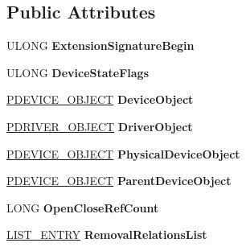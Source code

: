 \subsection*{Public Attributes}
\begin{DoxyCompactItemize}
\item 
\hypertarget{struct__DEVICE__EXTENSION_a3d2254b6955594ef19384f6e896a6509}{}U\+L\+O\+N\+G {\bfseries Extension\+Signature\+Begin}\label{struct__DEVICE__EXTENSION_a3d2254b6955594ef19384f6e896a6509}

\item 
\hypertarget{struct__DEVICE__EXTENSION_aed91a62442cb55f67cafd38ef2d188be}{}U\+L\+O\+N\+G {\bfseries Device\+State\+Flags}\label{struct__DEVICE__EXTENSION_aed91a62442cb55f67cafd38ef2d188be}

\item 
\hypertarget{struct__DEVICE__EXTENSION_a3d486ed344b5f222be45ec6d866df1b5}{}\hyperlink{struct__DEVICE__OBJECT}{P\+D\+E\+V\+I\+C\+E\+\_\+\+O\+B\+J\+E\+C\+T} {\bfseries Device\+Object}\label{struct__DEVICE__EXTENSION_a3d486ed344b5f222be45ec6d866df1b5}

\item 
\hypertarget{struct__DEVICE__EXTENSION_a3f483766814952d27da13d80801a2ce2}{}\hyperlink{struct__DRIVER__OBJECT}{P\+D\+R\+I\+V\+E\+R\+\_\+\+O\+B\+J\+E\+C\+T} {\bfseries Driver\+Object}\label{struct__DEVICE__EXTENSION_a3f483766814952d27da13d80801a2ce2}

\item 
\hypertarget{struct__DEVICE__EXTENSION_ab982ad8ed7465117668ff5227c3b0167}{}\hyperlink{struct__DEVICE__OBJECT}{P\+D\+E\+V\+I\+C\+E\+\_\+\+O\+B\+J\+E\+C\+T} {\bfseries Physical\+Device\+Object}\label{struct__DEVICE__EXTENSION_ab982ad8ed7465117668ff5227c3b0167}

\item 
\hypertarget{struct__DEVICE__EXTENSION_a2756f4d188b8636d5b1b685b1881e1ea}{}\hyperlink{struct__DEVICE__OBJECT}{P\+D\+E\+V\+I\+C\+E\+\_\+\+O\+B\+J\+E\+C\+T} {\bfseries Parent\+Device\+Object}\label{struct__DEVICE__EXTENSION_a2756f4d188b8636d5b1b685b1881e1ea}

\item 
\hypertarget{struct__DEVICE__EXTENSION_af4af2c77733cc09598d76db58302908a}{}L\+O\+N\+G {\bfseries Open\+Close\+Ref\+Count}\label{struct__DEVICE__EXTENSION_af4af2c77733cc09598d76db58302908a}

\item 
\hypertarget{struct__DEVICE__EXTENSION_a58ce6aa75f9180bff8dd67c5dd6f8a8b}{}\hyperlink{struct__LIST__ENTRY}{L\+I\+S\+T\+\_\+\+E\+N\+T\+R\+Y} {\bfseries Removal\+Relations\+List}\label{struct__DEVICE__EXTENSION_a58ce6aa75f9180bff8dd67c5dd6f8a8b}


\end{DoxyCompactItemize}
